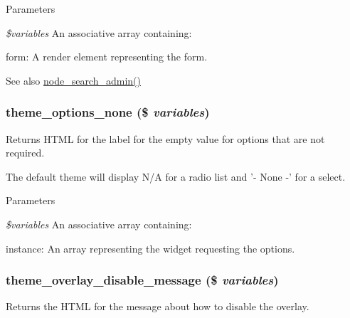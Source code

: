 \begin{DoxyParams}{Parameters}
\item[{\em \$variables}]An associative array containing:
\begin{DoxyItemize}
\item form: A render element representing the form.
\end{DoxyItemize}\end{DoxyParams}
\begin{DoxySeeAlso}{See also}
\hyperlink{node_8module_a68eda145ae4169ab8ed713b50ff035c8}{node\_\-search\_\-admin()} 
\end{DoxySeeAlso}
\hypertarget{group__themeable_gac1e1ed5c70484046a550344155a9bf6d}{
\subsubsection[{theme\_\-options\_\-none}]{\setlength{\rightskip}{0pt plus 5cm}theme\_\-options\_\-none (\$ {\em variables})}}
\label{group__themeable_gac1e1ed5c70484046a550344155a9bf6d}
Returns HTML for the label for the empty value for options that are not required.

The default theme will display N/A for a radio list and '-\/ None -\/' for a select.


\begin{DoxyParams}{Parameters}
\item[{\em \$variables}]An associative array containing:
\begin{DoxyItemize}
\item instance: An array representing the widget requesting the options. 
\end{DoxyItemize}\end{DoxyParams}
\hypertarget{group__themeable_ga2f95531a7317b7c7ed20e9e7ac411793}{
\subsubsection[{theme\_\-overlay\_\-disable\_\-message}]{\setlength{\rightskip}{0pt plus 5cm}theme\_\-overlay\_\-disable\_\-message (\$ {\em variables})}}
\label{group__themeable_ga2f95531a7317b7c7ed20e9e7ac411793}
Returns the HTML for the message about how to disable the overlay.


